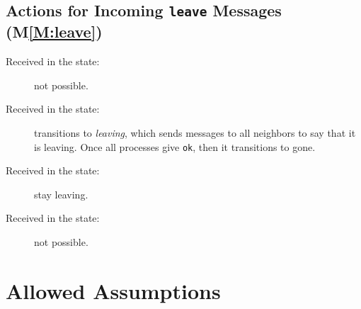 \documentclass[11pt]{article}
\begin{document}
\subsection{Actions for Incoming \texttt{leave} Messages (M\ref{M:leave})}
\begin{description}
\item[Received in the \joining state:] not possible.
\item[Received in the \available state:] transitions to \emph{leaving}, which sends messages to all neighbors to say that it is leaving. Once all processes give \texttt{ok}, then it transitions to gone.
\item[Received in the \leaving state:] stay leaving.
\item[Received in the \gone state:] not possible.
\end{description}


%
%

\section{Allowed Assumptions}
\end{document}
